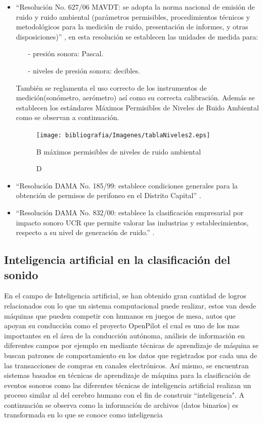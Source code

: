\begin{itemize}
\item     ``Resolución No. 627/06 MAVDT: se adopta la norma nacional de emisión de ruido y ruido ambiental (parámetros permisibles, procedimientos técnicos y metodológicos para  la medición de ruido, presentación de informes, y otras disposiciones)'' \cite{Ambiente}, en esta resolución se establecen las unidades de medida para: 

\begin{itemize}
    \item[-] presión sonora: Pascal.
    \item[-] niveles de presión sonora: decibles.
\end{itemize}

También se reglamenta el uso correcto de los instrumentos de medición(sonómetro, aerómetro) así como su correcta calibración. Además se establecen los estándares Máximos Permisibles de Niveles de Ruido Ambiental como se observan a continuación.

\begin{figure}[H]
\centering
\texttt{[image: bibliografia/Imagenes/tablaNiveles2.eps]}
\caption DB máximos permisibles de niveles de ruido ambiental {\cite{Ambiente}}
\end{figure}

\item     ``Resolución DAMA No. 185/99: establece condiciones generales para la obtención de permisos de perifoneo en el Distrito Capital'' \cite{Ambiente}.

\item     ``Resolución DAMA No. 832/00: establece la clasificación empresarial por impacto sonoro UCR que permite valorar las industrias y establecimientos, respecto a su nivel de generación de ruido.'' \cite{Ambiente}. 

\end{itemize}

\subsection{Inteligencia artificial en la clasificación del sonido}

En el campo de Inteligencia artificial, se han obtenido gran cantidad de logros relacionados con lo que un sistema computacional puede realizar, estos van desde máquinas que pueden competir con humanos en juegos de mesa\cite{Montesino2019}, autos que apoyan su conducción como el proyecto OpenPilot \cite{openPilot} el cual es uno de los mas importantes en el área de la conducción autónoma, análisis de información en diferentes campos por ejemplo en \cite{dornadula_credit_2019} mediante técnicas de aprendizaje de máquina se buscan patrones de comportamiento en los datos que registrados por cada una de las transacciones de compras en canales electrónicos. Así mismo, se encuentran sistemas basados en técnicas de aprendizaje de máquina para la clasificación de eventos sonoros como las diferentes técnicas de inteligencia artificial realizan un proceso similar al del cerebro humano con el fin de construir ``inteligencia". A continuación se observa como la información de archivos (datos binarios) es transformada en lo que se conoce como inteligencia 

